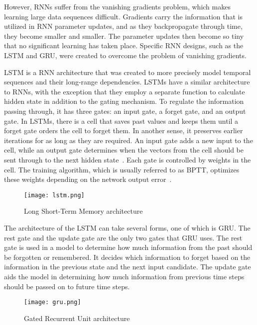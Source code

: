 However, RNNs suffer from the vanishing gradients problem, which makes learning large data sequences difficult. Gradients carry the information that is utilized in \gls{RNN} parameter updates, and as they backpropagate through time, they become smaller and smaller. The parameter updates then become so tiny that no significant learning has taken place. Specific \gls{RNN} designs, such as the \gls{LSTM} and \gls{GRU}, were created to overcome the problem of vanishing gradients.

\gls{LSTM} is a \gls{RNN} architecture that was created to more precisely model temporal sequences and their long-range dependencies. \gls{LSTM}s have a similar architecture to RNNs, with the exception that they employ a separate function to calculate hidden state in addition to the gating mechanism. To regulate the information passing through, it has three gates: an input gate, a forget gate, and an output gate. In \gls{LSTM}s, there is a cell that saves past values and keeps them until a forget gate orders the cell to forget them. In another sense, it preserves earlier iterations for as long as they are required. An input gate adds a new input to the cell, while an output gate determines when the vectors from the cell should be sent through to the next hidden state~\cite{Khan2019RNN-LSTM-GRUTransformation}. Each gate is controlled by weights in the cell. The training algorithm, which is usually referred to as \gls{BPTT}, optimizes these weights depending on the network output error~\cite{Madhavan2021DeepDeveloper}.

\begin{figure}[htbp]
    \centering
    \texttt{[image: lstm.png]}
    \caption{Long Short-Term Memory architecture~\cite{Madhavan2021DeepDeveloper}}
    \label{fig:lstm}
\end{figure}

The architecture of the \gls{LSTM} can take several forms, one of which is \gls{GRU}. The rest gate and the update gate are the only two gates that \gls{GRU} uses. The rest gate is used in a model to determine how much information from the past should be forgotten or remembered. It decides which information to forget based on the information in the previous state and the next input candidate. The update gate aids the model in determining how much information from previous time steps should be passed on to future time steps.

\begin{figure}[htbp]
    \centering
    \texttt{[image: gru.png]}
    \caption{Gated Recurrent Unit architecture~\cite{Madhavan2021DeepDeveloper}}
    \label{fig:gru}
\end{figure}

